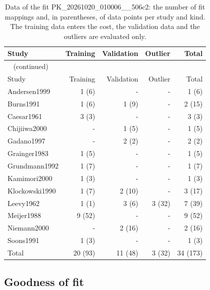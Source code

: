 \documentclass{article}
\begin{document}
\begin{longtable}{lrrrr}
\caption{Data of the fit PK\_20261020\_010006\_\_506c2: the number of fit mappings and, in parentheses, of data points per study and kind. The training data enters the cost, the validation data and the outliers are evaluated only.}\label{tab:data:PK_20261020_010006__506c2} \\
\toprule
Study & Training & Validation & Outlier & Total \\
\midrule
\endfirsthead
\multicolumn{5}{l}{\small\tablename~\thetable{} (continued)} \\
\toprule
Study & Training & Validation & Outlier & Total \\
\midrule
\endhead
\bottomrule
\endlastfoot
Andersen1999 & 1 (6) & - & - & 1 (6) \\
Burns1991 & 1 (6) & 1 (9) & - & 2 (15) \\
Caesar1961 & 3 (3) & - & - & 3 (3) \\
Chijiiwa2000 & - & 1 (5) & - & 1 (5) \\
Gadano1997 & - & 2 (2) & - & 2 (2) \\
Grainger1983 & 1 (5) & - & - & 1 (5) \\
Grundmann1992 & 1 (7) & - & - & 1 (7) \\
Kamimori2000 & 1 (3) & - & - & 1 (3) \\
Klockowski1990 & 1 (7) & 2 (10) & - & 3 (17) \\
Leevy1962 & 1 (1) & 3 (6) & 3 (32) & 7 (39) \\
Meijer1988 & 9 (52) & - & - & 9 (52) \\
Niemann2000 & - & 2 (16) & - & 2 (16) \\
Soons1991 & 1 (3) & - & - & 1 (3) \\
Total & 20 (93) & 11 (48) & 3 (32) & 34 (173) \\
\end{longtable}

\subsection{Goodness of fit}
\end{document}
